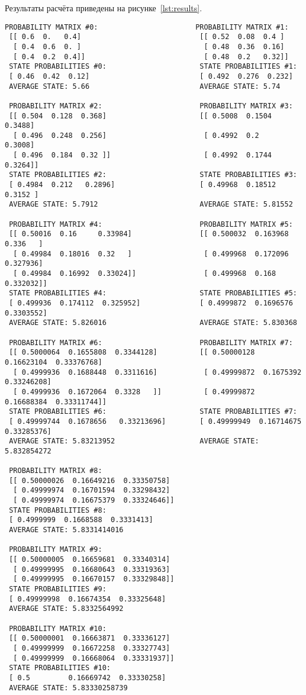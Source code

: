 \newpage
Результаты расчёта приведены на рисунке~\ref{lst:results}.
\begin{lstlisting}[caption=Результаты расчётов для десяти шагов,label=lst:results,
basicstyle=\scriptsize\ttfamily]
 PROBABILITY MATRIX #0:                       PROBABILITY MATRIX #1:
 [[ 0.6  0.   0.4]                            [[ 0.52  0.08  0.4 ]
  [ 0.4  0.6  0. ]                             [ 0.48  0.36  0.16]
  [ 0.4  0.2  0.4]]                            [ 0.48  0.2   0.32]]
 STATE PROBABILITIES #0:                      STATE PROBABILITIES #1:
 [ 0.46  0.42  0.12]                          [ 0.492  0.276  0.232]
 AVERAGE STATE: 5.66                          AVERAGE STATE: 5.74

 PROBABILITY MATRIX #2:                       PROBABILITY MATRIX #3:
 [[ 0.504  0.128  0.368]                      [[ 0.5008  0.1504  0.3488]
  [ 0.496  0.248  0.256]                       [ 0.4992  0.2     0.3008]
  [ 0.496  0.184  0.32 ]]                      [ 0.4992  0.1744  0.3264]]
 STATE PROBABILITIES #2:                      STATE PROBABILITIES #3:
 [ 0.4984  0.212   0.2896]                    [ 0.49968  0.18512  0.3152 ]
 AVERAGE STATE: 5.7912                        AVERAGE STATE: 5.81552

 PROBABILITY MATRIX #4:                       PROBABILITY MATRIX #5:
 [[ 0.50016  0.16     0.33984]                [[ 0.500032  0.163968  0.336   ]
  [ 0.49984  0.18016  0.32   ]                 [ 0.499968  0.172096  0.327936]
  [ 0.49984  0.16992  0.33024]]                [ 0.499968  0.168     0.332032]]
 STATE PROBABILITIES #4:                      STATE PROBABILITIES #5:
 [ 0.499936  0.174112  0.325952]              [ 0.4999872  0.1696576  0.3303552]
 AVERAGE STATE: 5.826016                      AVERAGE STATE: 5.830368

 PROBABILITY MATRIX #6:                       PROBABILITY MATRIX #7:
 [[ 0.5000064  0.1655808  0.3344128]          [[ 0.50000128  0.16623104  0.33376768]
  [ 0.4999936  0.1688448  0.3311616]           [ 0.49999872  0.1675392   0.33246208]
  [ 0.4999936  0.1672064  0.3328   ]]          [ 0.49999872  0.16688384  0.33311744]]
 STATE PROBABILITIES #6:                      STATE PROBABILITIES #7:
 [ 0.49999744  0.1678656   0.33213696]        [ 0.49999949  0.16714675  0.33285376]
 AVERAGE STATE: 5.83213952                    AVERAGE STATE: 5.832854272

 PROBABILITY MATRIX #8:
 [[ 0.50000026  0.16649216  0.33350758]
  [ 0.49999974  0.16701594  0.33298432]
  [ 0.49999974  0.16675379  0.33324646]]
 STATE PROBABILITIES #8:
 [ 0.4999999  0.1668588  0.3331413]
 AVERAGE STATE: 5.8331414016

 PROBABILITY MATRIX #9:
 [[ 0.50000005  0.16659681  0.33340314]
  [ 0.49999995  0.16680643  0.33319363]
  [ 0.49999995  0.16670157  0.33329848]]
 STATE PROBABILITIES #9:
 [ 0.49999998  0.16674354  0.33325648]
 AVERAGE STATE: 5.8332564992

 PROBABILITY MATRIX #10:
 [[ 0.50000001  0.16663871  0.33336127]
  [ 0.49999999  0.16672258  0.33327743]
  [ 0.49999999  0.16668064  0.33331937]]
 STATE PROBABILITIES #10:
 [ 0.5         0.16669742  0.33330258]
 AVERAGE STATE: 5.83330258739
\end{lstlisting}


